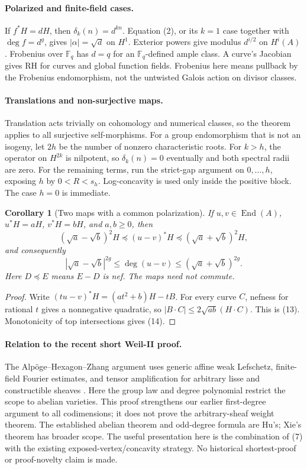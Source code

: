 \documentclass[11pt]{article}
\newtheorem{corollary}[theorem]{Corollary}
\newcommand{\End}{\operatorname{End}}
\begin{document}
\paragraph{Polarized and finite-field cases.}
If \(f^*H=dH\), then \(\delta_k(n)=d^{kn}\).
Equation (2), or its \(k=1\) case together with \(\deg f=d^g\),
gives \(|\alpha|=\sqrt d\) on \(H^1\).
Exterior powers give modulus \(d^{i/2}\) on \(H^i(A)\).
Frobenius over \(\mathbb F_q\) has \(d=q\) for an
\(\mathbb F_q\)-defined ample class. A curve's Jacobian gives
RH for curves and global function fields.
Frobenius here means pullback by the Frobenius endomorphism,
not the untwisted Galois action on divisor classes.

\paragraph{Translations and non-surjective maps.}
Translation acts trivially on cohomology and numerical classes, so
the theorem applies to all surjective self-morphisms.
For a group endomorphism that is not an isogeny, let \(2h\) be the number
of nonzero characteristic roots.
For \(k>h\), the operator on \(H^{2k}\) is nilpotent,
so \(\delta_k(n)=0\) eventually and both spectral radii are zero.
For the remaining terms, run the strict-gap argument on \(0,\ldots,h\),
exposing \(h\) by \(0<R<s_h\).
Log-concavity is used only inside the positive block.
The case \(h=0\) is immediate.

\begin{corollary}[Two maps with a common polarization]
If \(u,v\in\End(A)\), \(u^*H=aH\), \(v^*H=bH\), and \(a,b\ge0\), then
\[
 (\sqrt a-\sqrt b)^2H\preceq(u-v)^*H
 \preceq(\sqrt a+\sqrt b)^2H,
 \tag{13}
\]
and consequently
\[
 |\sqrt a-\sqrt b|^{2g}\le\deg(u-v)
 \le(\sqrt a+\sqrt b)^{2g}.
 \tag{14}
\]
Here \(D\preceq E\) means \(E-D\) is nef. The maps need not commute.
\end{corollary}
\begin{proof}
Write \((tu-v)^*H=(at^2+b)H-tB\).
For every curve \(C\), nefness for rational \(t\) gives a nonnegative
quadratic, so \(|B\cdot C|\le2\sqrt{ab}(H\cdot C)\).
This is (13). Monotonicity of top intersections gives (14).
\end{proof}

\paragraph{Relation to the recent short Weil-II proof.}
The Alp\"oge--Hexagon--Zhang argument uses generic affine weak Lefschetz,
finite-field Fourier estimates, and tensor amplification for arbitrary
lisse and constructible sheaves \cite{Hexagon,Zhang}.
Here the group law and degree polynomial restrict the scope to abelian
varieties. This proof strengthens our earlier first-degree argument to
all codimensions; it does not prove the arbitrary-sheaf weight theorem.
The established abelian theorem and odd-degree formula are Hu's;
Xie's theorem has broader scope. The useful presentation here is the
combination of (7) with the existing exposed-vertex/concavity strategy.
No historical shortest-proof or proof-novelty claim is made.
\end{document}
